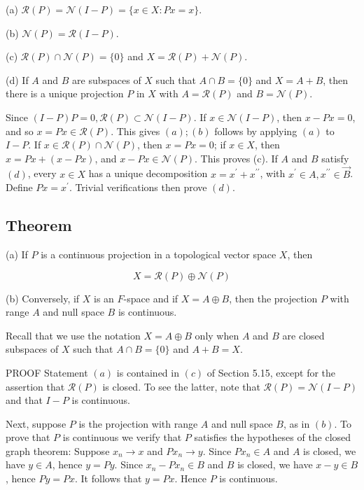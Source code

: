 \documentclass[10pt]{article}
\begin{document}
(a) $\mathscr{R}(P)=\mathscr{N}(I-P)=\{x \in X: P x=x\}$.

(b) $\mathscr{N}(P)=\mathscr{R}(I-P)$.

(c) $\mathscr{R}(P) \cap \mathscr{N}(P)=\{0\}$ and $X=\mathscr{R}(P)+\mathscr{N}(P)$.

(d) If $A$ and $B$ are subspaces of $X$ such that $A \cap B=\{0\}$ and $X=A+B$, then there is a unique projection $P$ in $X$ with $A=\mathscr{R}(P)$ and $B=\mathscr{N}(P)$.

Since $(I-P) P=0, \mathscr{R}(P) \subset \mathscr{N}(I-P)$. If $x \in \mathscr{N}(I-P)$, then $x-P x=0$, and so $x=P x \in \mathscr{R}(P)$. This gives $(a) ;(b)$ follows by applying $(a)$ to $I-P$. If $x \in \mathscr{R}(P) \cap \mathscr{N}(P)$, then $x=P x=0$; if $x \in X$, then $x=P x+(x-P x)$, and $x-P x \in \mathscr{N}(P)$. This proves (c). If $A$ and $B$ satisfy $(d)$, every $x \in X$ has a unique decomposition $x=x^{\prime}+x^{\prime \prime}$, with $x^{\prime} \in A, x^{\prime \prime} \in \vec{B}$. Define $P x=x^{\prime}$. Trivial verifications then prove $(d)$.

\subsection{Theorem}
(a) If $P$ is a continuous projection in a topological vector space $X$, then

$$
X=\mathscr{R}(P) \oplus \mathscr{N}(P)
$$

(b) Conversely, if $X$ is an $F$-space and if $X=A \oplus B$, then the projection $P$ with range $A$ and null space $B$ is continuous.

Recall that we use the notation $X=A \oplus B$ only when $A$ and $B$ are closed subspaces of $X$ such that $A \cap B=\{0\}$ and $A+B=X$.

PROOF Statement $(a)$ is contained in $(c)$ of Section 5.15, except for the assertion that $\mathscr{R}(P)$ is closed. To see the latter, note that $\mathscr{R}(P)=\mathscr{N}(I-P)$ and that $I-P$ is continuous.

Next, suppose $P$ is the projection with range $A$ and null space $B$, as in $(b)$. To prove that $P$ is continuous we verify that $P$ satisfies the hypotheses of the closed graph theorem: Suppose $x_{n} \rightarrow x$ and $P x_{n} \rightarrow y$. Since $P x_{n} \in A$ and $A$ is
closed, we have $y \in A$, hence $y=P y$. Since $x_{n}-P x_{n} \in B$ and $B$ is closed, we have $x-y \in B$, hence $P y=P x$. It follows that $y=P x$. Hence $P$ is continuous.
\end{document}
